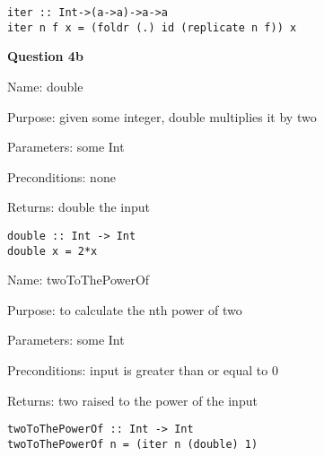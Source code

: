 \documentclass{article}
\begin{document}
\begin{lstlisting}
iter :: Int->(a->a)->a->a
iter n f x = (foldr (.) id (replicate n f)) x
\end{lstlisting}

\textbf{Question 4b}

Name: double

Purpose: given some integer, double multiplies it by two

Parameters: some Int

Preconditions: none

Returns: double the input

\begin{lstlisting}
double :: Int -> Int
double x = 2*x
\end{lstlisting}

Name: twoToThePowerOf

Purpose: to calculate the nth power of two

Parameters: some Int

Preconditions: input is greater than or equal to 0

Returns: two raised to the power of the input

\begin{lstlisting}
twoToThePowerOf :: Int -> Int
twoToThePowerOf n = (iter n (double) 1)
\end{lstlisting}
\end{document}
